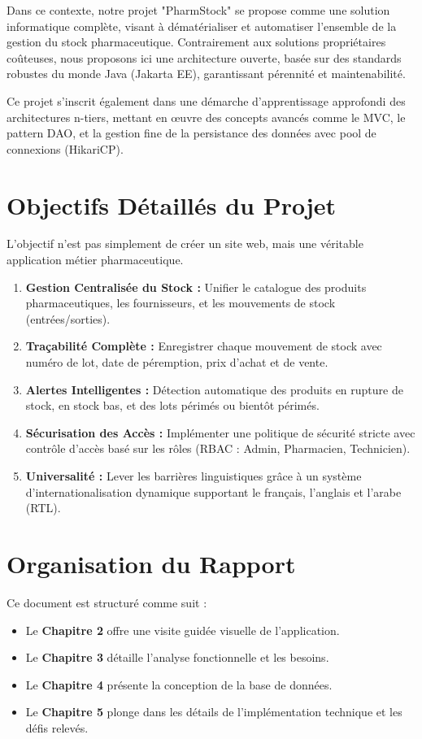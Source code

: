 \documentclass[12pt, a4paper]{report}
\begin{document}
Dans ce contexte, notre projet "PharmStock" se propose comme une solution informatique complète, visant à dématérialiser et automatiser l'ensemble de la gestion du stock pharmaceutique. Contrairement aux solutions propriétaires coûteuses, nous proposons ici une architecture ouverte, basée sur des standards robustes du monde Java (Jakarta EE), garantissant pérennité et maintenabilité.

Ce projet s'inscrit également dans une démarche d'apprentissage approfondi des architectures n-tiers, mettant en œuvre des concepts avancés comme le MVC, le pattern DAO, et la gestion fine de la persistance des données avec pool de connexions (HikariCP).

\section{Objectifs Détaillés du Projet}
L'objectif n'est pas simplement de créer un site web, mais une véritable application métier pharmaceutique.
\begin{enumerate}
    \item \textbf{Gestion Centralisée du Stock :} Unifier le catalogue des produits pharmaceutiques, les fournisseurs, et les mouvements de stock (entrées/sorties).
    \item \textbf{Traçabilité Complète :} Enregistrer chaque mouvement de stock avec numéro de lot, date de péremption, prix d'achat et de vente.
    \item \textbf{Alertes Intelligentes :} Détection automatique des produits en rupture de stock, en stock bas, et des lots périmés ou bientôt périmés.
    \item \textbf{Sécurisation des Accès :} Implémenter une politique de sécurité stricte avec contrôle d'accès basé sur les rôles (RBAC : Admin, Pharmacien, Technicien).
    \item \textbf{Universalité :} Lever les barrières linguistiques grâce à un système d'internationalisation dynamique supportant le français, l'anglais et l'arabe (RTL).
\end{enumerate}

\section{Organisation du Rapport}
Ce document est structuré comme suit :
\begin{itemize}
    \item Le \textbf{Chapitre 2} offre une visite guidée visuelle de l'application.
    \item Le \textbf{Chapitre 3} détaille l'analyse fonctionnelle et les besoins.
    \item Le \textbf{Chapitre 4} présente la conception de la base de données.
    \item Le \textbf{Chapitre 5} plonge dans les détails de l'implémentation technique et les défis relevés.
\end{itemize}
\end{document}
